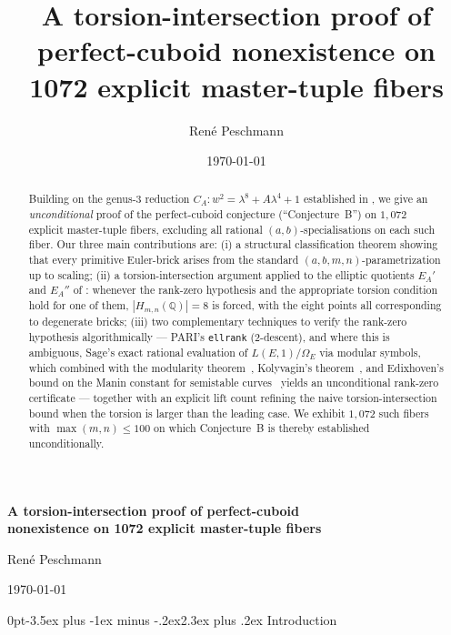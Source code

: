 \documentclass[12pt,a4paper,reqno]{amsart}
\title[Torsion-intersection nonexistence on 1072 fibers]{A torsion-intersection proof of perfect-cuboid nonexistence on 1072 explicit master-tuple fibers}
\author{Ren\'e Peschmann}
\date{\small \today}
\makeatletter
\renewcommand{\section}{\@startsection{section}{1}%
  {0pt}{-3.5ex plus -1ex minus -.2ex}{2.3ex plus .2ex}%
  {\normalfont\large\bfseries}}
\theoremstyle{plain}
\theoremstyle{definition}
\theoremstyle{remark}
\newcommand{\Q}{\mathbb{Q}}
\makeatother
\begin{document}
\maketitle

\begin{center}
  {\large\bfseries A torsion-intersection proof of perfect-cuboid\\nonexistence on 1072 explicit master-tuple fibers}
  \par\vskip 12pt
  {Ren\'e Peschmann}
  \par\vskip 4pt
  {\small \today}
\end{center}
\vskip 16pt

\begin{abstract}
Building on the genus-3 reduction $C_A : w^2 = \lambda^8 + A \lambda^4 + 1$ established in \cite{peschmann-paper1}, we give an \emph{unconditional} proof of the perfect-cuboid conjecture (``Conjecture~B'') on $1{,}072$ explicit master-tuple fibers, excluding all rational $(a,b)$-specialisations on each such fiber. Our three main contributions are: (i) a structural classification theorem showing that every primitive Euler-brick arises from the standard $(a,b,m,n)$-parametrization up to scaling; (ii) a torsion-intersection argument applied to the elliptic quotients $E_A'$ and $E_A''$ of \cite[\S 4.1]{peschmann-paper1}: whenever the rank-zero hypothesis and the appropriate torsion condition hold for one of them, $|H_{m,n}(\Q)| = 8$ is forced, with the eight points all corresponding to degenerate bricks; (iii) two complementary techniques to verify the rank-zero hypothesis algorithmically — PARI's \texttt{ellrank} (2-descent), and where this is ambiguous, Sage's exact rational evaluation of $L(E,1)/\Omega_E$ via modular symbols, which combined with the modularity theorem~\cite{breuil-conrad-diamond-taylor}, Kolyvagin's theorem~\cite{kolyvagin}, and Edixhoven's bound on the Manin constant for semistable curves~\cite{edixhoven-manin} yields an unconditional rank-zero certificate — together with an explicit lift count refining the naive torsion-intersection bound when the torsion is larger than the leading case. We exhibit $1{,}072$ such fibers with $\max(m, n) \le 100$ on which Conjecture~B is thereby established unconditionally.
\end{abstract}

\section{Introduction}
\label{sec:intro}
\end{document}
